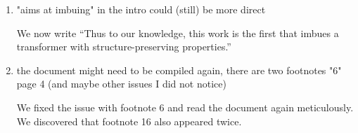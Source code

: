\documentclass{article}
\begin{document}
\begin{enumerate}
{    }

    \item "aims at imbuing" in the intro could (still) be more direct

    {\color{mred}We now write ``Thus to our knowledge, this work is the first that imbues a transformer with structure-preserving properties.''}
    \item the document might need to be compiled again, there are two footnotes "6" page 4 (and maybe other issues I did not notice)

    {\color{mred}We fixed the issue with footnote 6 and read the document again meticulously. We discovered that footnote 16 also appeared twice.}
\end{enumerate}
\end{document}
